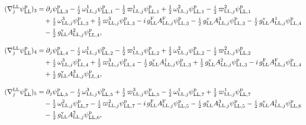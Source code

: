 \documentclass[
  10pt,
]{article}
\begin{document}
\[\begin{aligned}
(\nabla^{\rm LL}_j\psi^{\rm p}_{\rm LL})_3&=\partial_j\psi^{\rm p}_{{\rm LL},3}-\tfrac{i}{2}\,\omega^{1}_{{\rm LL},j}\psi^{\rm p}_{{\rm LL},1}-\tfrac{1}{2}\,\varpi^{1}_{{\rm LL},j}\psi^{\rm p}_{{\rm LL},1}+\tfrac{1}{2}\,\omega^{2}_{{\rm LL},j}\psi^{\rm p}_{{\rm LL},1}-\tfrac{i}{2}\,\varpi^{2}_{{\rm LL},j}\psi^{\rm p}_{{\rm LL},1}\\
&\quad +\tfrac{i}{2}\,\omega^{3}_{{\rm LL},j}\psi^{\rm p}_{{\rm LL},3}+\tfrac{1}{2}\,\varpi^{3}_{{\rm LL},j}\psi^{\rm p}_{{\rm LL},3}-i\,g^{\rm F}_{\rm LL}A^{\rm F}_{{\rm LL},j}\psi^{\rm p}_{{\rm LL},3}-\tfrac{i}{2}\,g^{\rm v}_{\rm LL}A^{3}_{{\rm LL},j}\psi^{\rm p}_{{\rm LL},3}-\tfrac{i}{2}\,g^{\rm v}_{\rm LL}A^{1}_{{\rm LL},j}\psi^{\rm p}_{{\rm LL},4}\\
&\quad -\tfrac{1}{2}\,g^{\rm v}_{\rm LL}A^{2}_{{\rm LL},j}\psi^{\rm p}_{{\rm LL},4},
\end{aligned}\]

\[\begin{aligned}
(\nabla^{\rm LL}_j\psi^{\rm p}_{\rm LL})_4&=\partial_j\psi^{\rm p}_{{\rm LL},4}-\tfrac{i}{2}\,\omega^{1}_{{\rm LL},j}\psi^{\rm p}_{{\rm LL},2}-\tfrac{1}{2}\,\varpi^{1}_{{\rm LL},j}\psi^{\rm p}_{{\rm LL},2}+\tfrac{1}{2}\,\omega^{2}_{{\rm LL},j}\psi^{\rm p}_{{\rm LL},2}-\tfrac{i}{2}\,\varpi^{2}_{{\rm LL},j}\psi^{\rm p}_{{\rm LL},2}\\
&\quad +\tfrac{i}{2}\,\omega^{3}_{{\rm LL},j}\psi^{\rm p}_{{\rm LL},4}+\tfrac{1}{2}\,\varpi^{3}_{{\rm LL},j}\psi^{\rm p}_{{\rm LL},4}-\tfrac{i}{2}\,g^{\rm v}_{\rm LL}A^{1}_{{\rm LL},j}\psi^{\rm p}_{{\rm LL},3}+\tfrac{1}{2}\,g^{\rm v}_{\rm LL}A^{2}_{{\rm LL},j}\psi^{\rm p}_{{\rm LL},3}-i\,g^{\rm F}_{\rm LL}A^{\rm F}_{{\rm LL},j}\psi^{\rm p}_{{\rm LL},4}\\
&\quad +\tfrac{i}{2}\,g^{\rm v}_{\rm LL}A^{3}_{{\rm LL},j}\psi^{\rm p}_{{\rm LL},4},
\end{aligned}\]

\[\begin{aligned}
(\nabla^{\rm LL}_j\psi^{\rm p}_{\rm LL})_5&=\partial_j\psi^{\rm p}_{{\rm LL},5}-\tfrac{i}{2}\,\omega^{3}_{{\rm LL},j}\psi^{\rm p}_{{\rm LL},5}+\tfrac{1}{2}\,\varpi^{3}_{{\rm LL},j}\psi^{\rm p}_{{\rm LL},5}-\tfrac{i}{2}\,\omega^{1}_{{\rm LL},j}\psi^{\rm p}_{{\rm LL},7}+\tfrac{1}{2}\,\varpi^{1}_{{\rm LL},j}\psi^{\rm p}_{{\rm LL},7}\\
&\quad -\tfrac{1}{2}\,\omega^{2}_{{\rm LL},j}\psi^{\rm p}_{{\rm LL},7}-\tfrac{i}{2}\,\varpi^{2}_{{\rm LL},j}\psi^{\rm p}_{{\rm LL},7}-i\,g^{\rm F}_{\rm LL}A^{\rm F}_{{\rm LL},j}\psi^{\rm p}_{{\rm LL},5}-\tfrac{i}{2}\,g^{\rm v}_{\rm LL}A^{3}_{{\rm LL},j}\psi^{\rm p}_{{\rm LL},5}-\tfrac{i}{2}\,g^{\rm v}_{\rm LL}A^{1}_{{\rm LL},j}\psi^{\rm p}_{{\rm LL},6}\\
&\quad -\tfrac{1}{2}\,g^{\rm v}_{\rm LL}A^{2}_{{\rm LL},j}\psi^{\rm p}_{{\rm LL},6},
\end{aligned}\]
\end{document}

